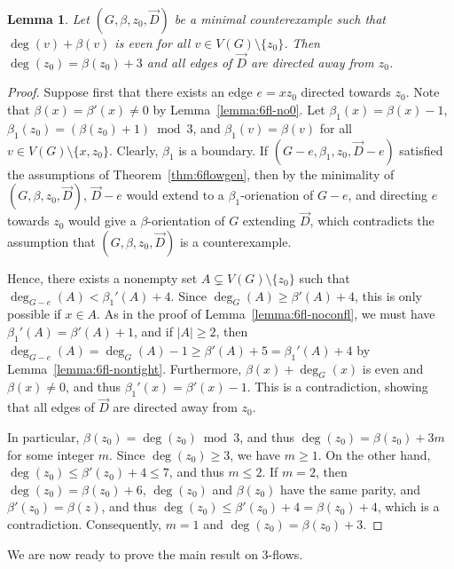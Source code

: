 \documentclass[12pt,twoside,openright,a4paper]{book}
\newtheorem{lemma}[theorem]{Lemma}
\begin{document}
\begin{lemma}\label{lemma:fl6all}
Let $(G,\beta,z_0,\vec{D})$ be a minimal counterexample such that $\deg(v)+\beta(v)$ is even for all $v\in V(G)\setminus \{z_0\}$.
Then $\deg(z_0)=\beta(z_0)+3$ and all edges of $\vec{D}$ are directed away from $z_0$.
\end{lemma}
\begin{proof}
Suppose first that there exists an edge $e=xz_0$ directed towards $z_0$.  Note that $\beta(x)=\beta'(x)\neq 0$ by Lemma~\ref{lemma:6fl-no0}.
Let $\beta_1(x)=\beta(x)-1$, $\beta_1(z_0)=(\beta(z_0)+1)\bmod 3$, and $\beta_1(v)=\beta(v)$ for all $v\in V(G)\setminus \{x,z_0\}$.
Clearly, $\beta_1$ is a boundary.  If $(G-e,\beta_1,z_0,\vec{D}-e)$ satisfied the assumptions of Theorem~\ref{thm:6flowgen}, then by the minimality of $(G,\beta,z_0,\vec{D})$,
$\vec{D}-e$ would extend to a $\beta_1$-orienation of $G-e$, and directing $e$ towards $z_0$ would give a $\beta$-orientation of $G$ extending $\vec{D}$,
which contradicts the assumption that $(G,\beta,z_0,\vec{D})$ is a counterexample.

Hence, there exists a nonempty set $A\subsetneq V(G)\setminus \{z_0\}$ such that $\deg_{G-e}(A)<\beta_1'(A)+4$.  Since $\deg_G(A)\ge\beta'(A)+4$,
this is only possible if $x\in A$.  As in the proof of Lemma~\ref{lemma:6fl-noconfl}, we must have $\beta_1'(A)=\beta'(A)+1$, and
if $|A|\ge 2$, then $\deg_{G-e}(A)=\deg_G(A)-1\ge \beta'(A)+5=\beta_1'(A)+4$ by Lemma~\ref{lemma:6fl-nontight}.
Furthermore, $\beta(x)+\deg_G(x)$ is even and $\beta(x)\neq 0$, and thus $\beta_1'(x)=\beta'(x)-1$.
This is a contradiction, showing that all edges of $\vec{D}$ are directed away from $z_0$.

In particular, $\beta(z_0)=\deg(z_0)\bmod 3$, and thus $\deg(z_0)=\beta(z_0)+3m$ for some integer $m$.
Since $\deg(z_0)\ge 3$, we have $m\ge 1$.  On the other hand, $\deg(z_0)\le \beta'(z_0)+4\le 7$, and thus $m\le 2$.
If $m=2$, then $\deg(z_0)=\beta(z_0)+6$, $\deg(z_0)$ and $\beta(z_0)$ have the same parity, and $\beta'(z_0)=\beta(z)$,
and thus $\deg(z_0)\le \beta'(z_0)+4=\beta(z_0)+4$, which is a contradiction.  Consequently, $m=1$
and $\deg(z_0)=\beta(z_0)+3$.
\end{proof}

We are now ready to prove the main result on $3$-flows.
\end{document}
